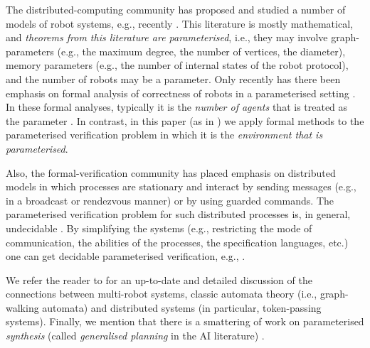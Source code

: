 \documentclass{llncs}
\newcommand{\sr}[1]{\footnote{{\color{red} Note. #1}}}
\renewcommand{\sr}[1]{}
\begin{document}
The distributed-computing community has proposed and studied a number of models of robot systems, e.g., recently
\cite{Bender20021,KKR06,GR08,Das13,Diks200438,Cohen05graphexploration,FIPPP04}. This literature is mostly mathematical, and {\em theorems from this literature are parameterised}, i.e., they may involve {graph-parameters} (e.g., the maximum degree, the number of vertices, the diameter), {memory parameters} (e.g., the number of internal states of the robot protocol), and the {number of robots} may be a parameter.
Only recently has there been emphasis on formal analysis of correctness of robots in a parameterised
setting \cite{KoLo13AAMAS,ABCTU13,MPST14,KoLo15,Rubin15AAMAS}. In these formal analyses, typically it is the {\em number of agents} that is treated as the parameter \cite{KoLo13AAMAS,ABCTU13,MPST14,KoLo15}. In contrast, in this paper (as in \cite{Rubin15AAMAS}) we apply formal methods to the parameterised verification problem in which it is the {\em environment that is parameterised}.


Also, the formal-verification community has placed emphasis on distributed models in which processes are stationary and interact  by sending messages (e.g., in a broadcast or rendezvous manner) or by using guarded commands. The parameterised verification problem for such distributed processes is, in general, undecidable \cite{AK86,Suzuki}. By simplifying the systems (e.g., restricting the mode of communication, the abilities of the processes, the specification languages, etc.) one can get decidable parameterised verification, e.g.,  \cite{EsparzaFM99,EmersonK03LICS,CTTV04,KoLo13AAMAS,Delz14,AJKR14,AKRSV14}.

We refer the reader to \cite[Section~$7$]{Rubin15AAMAS} for an up-to-date and detailed discussion of the connections between multi-robot systems, classic automata theory (i.e., graph-walking automata) %
and distributed systems (in particular, token-passing systems).
%
Finally, we mention that there is a smattering of work on parameterised {\em synthesis} (called {\em generalised planning} in the AI literature)
\cite{GFPS10,HuG11,KJB13CAV,KJB13VMCAI}.

\end{document}

